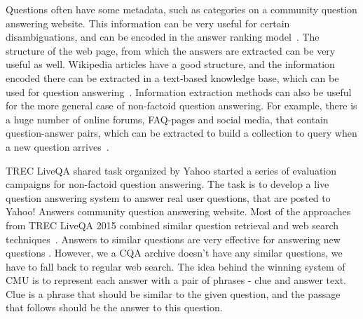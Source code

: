 Questions often have some metadata, such as categories on a community question answering website.
This information can be very useful for certain disambiguations, and can be encoded in the answer ranking model~\cite{zhou2015learning}.
The structure of the web page, from which the answers are extracted can be very useful as well.
Wikipedia articles have a good structure, and the information encoded there can be extracted in a text-based knowledge base, which can be used for question answering~\cite{sondhi2014mining}.
Information extraction methods can also be useful for the more general case of non-factoid question answering.
For example, there is a huge number of online forums, FAQ-pages and social media, that contain question-answer pairs, which can be extracted to build a collection to query when a new question arrives~\cite{cong2008finding,Jijkoun:2005:RAF:1099554.1099571,Yang:2009:ISK:1526709.1526735,ding2008using,li2011question}.

TREC LiveQA shared task organized by Yahoo started a series of evaluation campaigns for non-factoid question answering.
The task is to develop a live question answering system to answer real user questions, that are posted to Yahoo! Answers community question answering website.
Most of the approaches from TREC LiveQA 2015 combined similar question retrieval and web search techniques~\cite{ecnucs_liveqa15,savenkov_liveqa15,diwang_liveqa15}.
Answers to similar questions are very effective for answering new questions \cite{savenkov_liveqa15}.
However, we a CQA archive doesn't have any similar questions, we have to fall back to regular web search.
The idea behind the winning system of CMU \cite{diwang_liveqa15} is to represent each answer with a pair of phrases - clue and answer text.
Clue is a phrase that should be similar to the given question, and the passage that follows should be the answer to this question.

